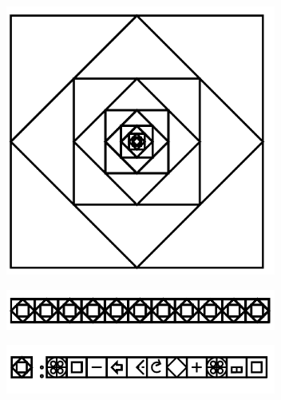 \documentclass[11pt]{article}
\begin{document}
\includegraphics[width=3.5in]{image40.png}

\includegraphics[width=3.5in]{image41.png}

\includegraphics[width=3.5in]{image42.png}
\end{document}
